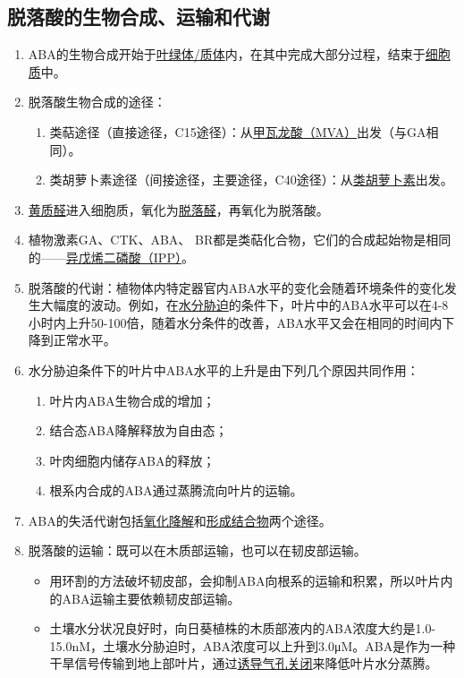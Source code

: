 \subsection{脱落酸的生物合成、运输和代谢}
\begin{enumerate}
    \item ABA的生物合成开始于\uline{叶绿体/质体}内，在其中完成大部分过程，结束于\uline{细胞质}中。
    \item 脱落酸生物合成的途径：
    \begin{enumerate}
        \item 类萜途径（直接途径，C15途径）：从\uline{甲瓦龙酸（MVA）}出发（与GA相同）。
        \item 类胡萝卜素途径（间接途径，主要途径，C40途径）：从\uline{类胡萝卜素}出发。
    \end{enumerate}
    \item \uline{黄质醛}进入细胞质，氧化为\uline{脱落醛}，再氧化为脱落酸。
    \item 植物激素GA、CTK、ABA、 BR都是类萜化合物，它们的合成起始物是相同的——\uline{异戊烯二磷酸（IPP）}。
    \item 脱落酸的代谢：植物体内特定器官内ABA水平的变化会随着环境条件的变化发生大幅度的波动。例如，在\uline{水分胁迫}的条件下，叶片中的ABA水平可以在4-8小时内上升50-100倍，随着水分条件的改善，ABA水平又会在相同的时间内下降到正常水平。
    \item 水分胁迫条件下的叶片中ABA水平的上升是由下列几个原因共同作用：
    \begin{enumerate}
        \item 叶片内ABA生物合成的增加；
        \item 结合态ABA降解释放为自由态；
        \item 叶肉细胞内储存ABA的释放；
        \item 根系内合成的ABA通过蒸腾流向叶片的运输。 
    \end{enumerate}
    \item ABA的失活代谢包括\uline{氧化降解}和\uline{形成结合物}两个途径。
    \item 脱落酸的运输：既可以在木质部运输，也可以在韧皮部运输。
    \begin{itemize}
        \item 用环割的方法破坏韧皮部，会抑制ABA向根系的运输和积累，所以叶片内的ABA运输主要依赖韧皮部运输。
        \item 土壤水分状况良好时，向日葵植株的木质部液内的ABA浓度大约是1.0-15.0nM，土壤水分胁迫时，ABA浓度可以上升到3.0μM。ABA是作为一种干旱信号传输到地上部叶片，通过\uline{诱导气孔关闭}来降低叶片水分蒸腾。
    \end{itemize}
\end{enumerate}
